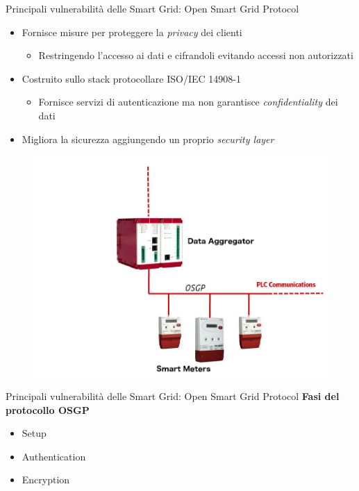 \begin{frame}{Principali vulnerabilità delle Smart Grid: Open Smart Grid Protocol}
	\begin{itemize}[<+- | alert@+>]
		\item Fornisce misure per proteggere la \emph{privacy} dei clienti
		\begin{itemize}[<+- | alert@+>]
			\item Restringendo l'accesso ai dati e cifrandoli evitando accessi non autorizzati
		\end{itemize}
		\item Costruito sullo stack protocollare ISO/IEC 14908-1
		\begin{itemize}[<+- | alert@+>]
			\item Fornisce servizi di autenticazione ma non garantisce \emph{confidentiality} dei dati
		\end{itemize}
		\item Migliora la sicurezza aggiungendo un proprio \emph{security layer}
	\end{itemize}
	\begin{figure}[h] 
		\includegraphics[scale=0.15,cfbox=blue_slides 1pt 0pt]{imgs/aggregator.jpg}
	\end{figure}
\end{frame}

\begin{frame}{Principali vulnerabilità delle Smart Grid: Open Smart Grid Protocol}
	\textbf{Fasi del protocollo OSGP}
	\begin{itemize}
		\item Setup
		\item Authentication
		\item Encryption
	\end{itemize}
\end{frame}

